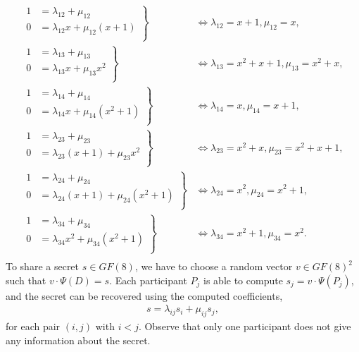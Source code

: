 \begin{equation*}
    \begin{split}
        \left.\begin{aligned}
        1 & = \lambda_{12} + \mu_{12}\\
        0 & = \lambda_{12} x + \mu_{12} (x+1)\\
        \end{aligned}\right\} & \iff \lambda_{12} = x + 1, \mu_{12} = x,\\
        \left.\begin{aligned}
        1 & = \lambda_{13} + \mu_{13}\\
        0 & = \lambda_{13} x + \mu_{13} x^2\\
        \end{aligned}\right\} & \iff \lambda_{13} = x^2+x+1,\mu_{13} = x^2+x,\\
        \left.\begin{aligned}
        1 & = \lambda_{14} + \mu_{14}\\
        0 & = \lambda_{14} x + \mu_{14} (x^2+1)\\
        \end{aligned}\right\} & \iff \lambda_{14} = x,\mu_{14} = x+1,\\
        \left.\begin{aligned}
        1 & = \lambda_{23} + \mu_{23}\\
        0 & = \lambda_{23} (x+1) + \mu_{23} x^2\\
        \end{aligned}\right\} & \iff \lambda_{23} = x^2+x,\mu_{23} = x^2+x+1,\\
        \left.\begin{aligned}
        1 & = \lambda_{24} + \mu_{24}\\
        0 & = \lambda_{24} (x+1) + \mu_{24} (x^2+1)\\
        \end{aligned}\right\} & \iff \lambda_{24} = x^2,\mu_{24} = x^2+1,\\
        \left.\begin{aligned}
        1 & = \lambda_{34} + \mu_{34}\\
        0 & = \lambda_{34} x^2 + \mu_{34} (x^2+1)\\
        \end{aligned}\right\} & \iff \lambda_{34} = x^2+1,\mu_{34} = x^2.\\
    \end{split}
\end{equation*}
To share a secret $s \in GF(8)$, we have to choose a random vector $v\in GF(8)^2$ such that $v\cdot\Psi(D) = s$.
Each participant $P_j$ is able to compute $s_j = v\cdot \Psi(P_j)$, and the secret can be recovered using the computed coefficients, 
\begin{equation*}
    \begin{split}
        s = \lambda_{ij}s_i + \mu_{ij}s_j,
    \end{split}
\end{equation*}
for each pair $(i,j)$ with $i<j$.
Observe that only one participant does not give any information about the secret.


